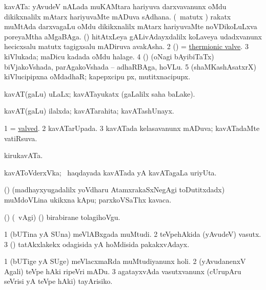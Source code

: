 \bentry
{} 
\gl{\nA}
\expl{}
\bmng
\bnum
{} kavATa: 
\banum
{} yAvudeV nALada muKAMtara hariyuva darxvavanunx oMdu dikikxnalilx mAtarx hariyuvaMte mADuva sAdhana. 
 (\aMrashA\ matutx \pArxvi) rakatx muMtAda darxvagaLu oMdu dikikxnalilx mAtarx hariyuvaMte noVDikoLuLxva poreyaMtha aMgaBAga. 
 (\saM) hitAtxLeya gALivAdayxdalilx koLaveya udadxvanunx hecicxsalu matutx tagigxsalu mADiruva avakAsha. 
\eanum
\numie
\num{2} (\birx) = \hyperref{kandict_t.pdf}{T}{thermionic valve}{thermionic valve}. 
\num{3} kiVlukada; maDicu kadada oMdu halage. 
\num{4} (\savi) (oNagi bAyibiTaTx) biVjakoVshada, parAgakoVshada -- adhaRBAga, hoVLu. 
\num{5} (shaMKashAsatxrX) kiVlucipipxna oMdadhaR; kapepxcipu px, mutitxnacipupx. 
\enum
\emng
\eentry

\bentry
{} 
\gl{\gu}
\expl{}
\bmng
 kavAT(gaLu) uLaLx; kavATayukatx (\saMpa gaLalilx saha baLake). 
\emng
\eentry

\bentry
{} 
\gl{\gu}
\expl{}
\bmng
 kavAT(gaLu) ilalxda; kavATarahita; kavATashUnayx. 
\emng
\eentry

\bentry
{} 
\gl{\gu}
\expl{}
\bmng
\bnum
\num{1} = \hyperlink{valved}{valved}. 
\num{2} kavATarUpada. 
\num{3} kavATada kelasavanunx mADuva; kavATadaMte vatiRsuva. 
\enum
\emng
\eentry

\bentry
{} 
\gl{\nA}
\expl{}
\bmng
 kirukavATa. 
\emng
\eentry

\bentry
{} 
\gl{\nA}
\expl{}
\bmng
 kavAToVderxVka; \kanmu\ haqdayada kavATada yA kavATagaLa uriyUta. 
\emng
\eentry

\bentry
{} 
\gl{\nA}
\expl{}
\bmng
 (\ca) (madhayxyugadalilx yoVdharu AtamxrakaSxNegAgi toDutitxdadx) muMdoVLina ukikxna kApu; parxkoVSaThx kavaca. 
\emng
\eentry

\bentry
{} 
\gl{\akirx}
\expl{}
\bmng
 (\ame) (\kanmu\ \BAavayx vAgi) (\ashi) birabirane tolagihoVgu. 
\emng
\eentry

\bentry
{} 
\gl{\nA}
\expl{}
\bmng
\bnum
\num{1} (bUTina yA SUna) meVlABxgada muMtudi. 
\num{2} teVpehAkida (yAvudeV) vasutx. 
\num{3} (\saM) tatAkxlakekx odagisida yA hoMdisida pakakxvAdayx. 
\enum
\emng
\eentry

\bentry
{} 
\gl{\sakirx}
\expl{}
\bmng
\bnum
\num{1} (bUTige yA SUge) meVlacxmaRda muMtudiyanunx holi. 
\num{2} (yAvudanenxV Agali) teVpe hAki ripeVri mADu. 
\num{3} agatayxvAda vasutxvanunx (cUrupAru seVrisi yA teVpe hAki) tayArisiko. 
\enum
\emng

